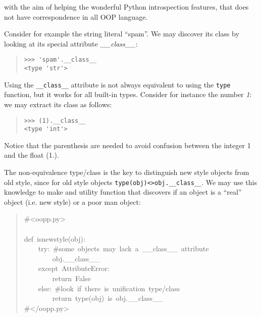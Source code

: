 \documentclass[10pt,english]{article}
\begin{document}
with the aim of helping the wonderful Python introspection features, that
does not have correspondence in all OOP language.

Consider for example the string literal ``spam''. We may discover its
class by looking at its special attribute \emph{{\_}{\_}class{\_}{\_}}:
\begin{quote}
\begin{verbatim}>>> 'spam'.__class__
<type 'str'>\end{verbatim}
\end{quote}

Using the \texttt{{\_}{\_}class{\_}{\_}} attribute is not always equivalent to using the 
\texttt{type} function, but it works for all built-in types. Consider for instance 
the number \emph{1}: we may extract its class as follows:
\begin{quote}
\begin{verbatim}>>> (1).__class__
<type 'int'>\end{verbatim}
\end{quote}

Notice that the parenthesis are needed to avoid confusion between the integer
1 and the float (1.).

The non-equivalence type/class is the key to distinguish new style objects from
old style, since for old style objects \texttt{type(obj)<>obj.{\_}{\_}class{\_}{\_}}.
We may use this knowledge to make and utility function that discovers
if an object is a ``real'' object (i.e. new style) or a poor man object:
\begin{quote}
\begin{ttfamily}\begin{flushleft}
\mbox{{\#}<oopp.py>}\\
\mbox{}\\
\mbox{def~isnewstyle(obj):}\\
\mbox{~~~~try:~{\#}some~objects~may~lack~a~{\_}{\_}class{\_}{\_}~attribute~}\\
\mbox{~~~~~~~~obj.{\_}{\_}class{\_}{\_}}\\
\mbox{~~~~except~AttributeError:}\\
\mbox{~~~~~~~~return~False}\\
\mbox{~~~~else:~{\#}look~if~there~is~unification~type/class}\\
\mbox{~~~~~~~~return~type(obj)~is~obj.{\_}{\_}class{\_}{\_}}\\
\mbox{{\#}</oopp.py>}
\end{flushleft}\end{ttfamily}
\end{quote}
\end{document}
